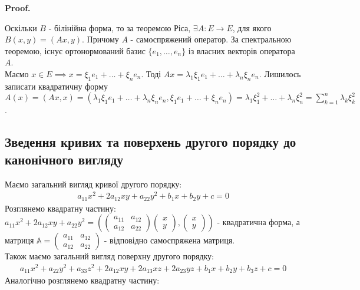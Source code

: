 \documentclass[a4paper, 10pt]{article}
\makeatletter
\def\huge{\displaystyle}
\def\qed{$\blacksquare$}
\theoremstyle{theoremdd}
\theoremstyle{theoremdd}
\theoremstyle{theoremdd}
\theoremstyle{theoremdd}
\theoremstyle{theoremdd}
\theoremstyle{theoremdd}
\theoremstyle{theoremdd}
\theoremstyle{theoremdd}
\renewenvironment{proof}[1][Proof.\\]{\par
\pushQED{\hfill \qed}%
\normalfont \topsep6\p@\@plus6\p@\relax
\trivlist
\item\relax
{\bfseries
#1\@addpunct{.}}\hspace\labelsep\ignorespaces
}{%
\popQED\endtrivlist\@endpefalse
}
\makeatother
\begin{document}
\begin{proof}
Оскільки $B$ - білінійна форма, то за теоремою Ріса, $\exists A: E \to E$, для якого $B(x,y) = (Ax,y)$. Причому $A$ - самоспряжений оператор. За спектральною теоремою, існує ортонормований базис $\{e_1,\dots,e_n\}$ із власних векторів оператора $A$.\\
Маємо $x \in E \implies x = \xi_1 e_1 + \dots + \xi_n e_n$. Тоді $Ax = \lambda_1 \xi_1 e_1 + \dots + \lambda_n \xi_n e_n$. Лишилось записати квадратичну форму\\
$A(x) = (Ax,x) = (\lambda_1 \xi_1 e_1 + \dots + \lambda_n \xi_n e_n, \xi_1 e_1 + \dots + \xi_n e_n) = \lambda_1 \xi_1^2 + \dots + \lambda_n \xi_n^2 = \huge\sum_{k=1}^n \lambda_k \xi_k^2$.
\end{proof}

\subsection{Зведення кривих та поверхень другого порядку до канонічного вигляду}
Маємо загальний вигляд кривої другого порядку:
\begin{align*}
a_{11}x^2 + 2a_{12}xy + a_{22}y^2 + b_1x + b_2y + c = 0
\end{align*}
Розглянемо квадратну частину:\\
$a_{11}x^2 + 2a_{12}xy + a_{22}y^2 = \left( \begin{pmatrix}
 a_{11} & a_{12} \\
 a_{12} & a_{22}
\end{pmatrix} \begin{pmatrix}
x \\ y
\end{pmatrix}, \begin{pmatrix}
x \\ y
\end{pmatrix} \right)$ - квадратична форма, а матриця $\mathbb{A} = \begin{pmatrix}
a_{11} & a_{12} \\
a_{12} & a_{22}
\end{pmatrix}$ - відповідно самоспряжена матриця.
\bigskip \\
Також маємо загальний вигляд поверхну другого порядку:
\begin{align*}
a_{11}x^2 + a_{22}y^2 + a_{33}z^2 + 2a_{12}xy + 2a_{13}xz + 2a_{23}yz + b_1x + b_2y + b_3z + c = 0
\end{align*}
Аналогічно розглянемо квадратну частину:\\
\end{document}
